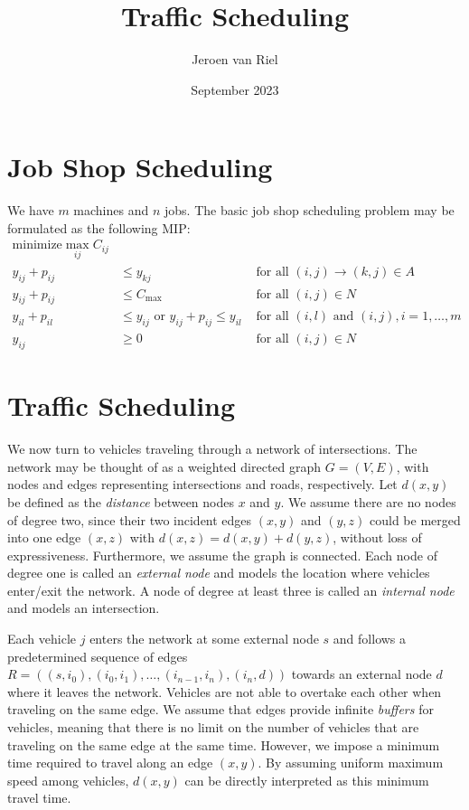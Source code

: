 \documentclass{article}
\title{Traffic Scheduling}
\author{Jeroen van Riel}
\date{September 2023}
\begin{document}
\maketitle

\section{Job Shop Scheduling}
We have $m$ machines and $n$ jobs. The basic job shop scheduling problem may be
formulated as the following MIP:
\begin{align*}
  \text{minimize} \max_{ij} C_{ij} \\
  y_{ij} + p_{ij} &\leq y_{kj}  & \text{ for all } (i,j) \xrightarrow{} (k,j) \in A \\
  y_{ij} + p_{ij} &\leq C_{\text{max}} & \text{ for all } (i,j) \in N \\
  y_{il} + p_{il} &\leq  y_{ij} \text{ or } y_{ij} + p_{ij} \leq y_{il}  & \text{ for all } (i,l) \text{ and } (i,j), i =1, \dots,m \\
  y_{ij} &\geq 0 & \text{ for all } (i,j) \in N
\end{align*}


\section{Traffic Scheduling}

We now turn to vehicles traveling through a network of intersections. The
network may be thought of as a weighted directed graph $G=(V,E)$, with nodes and
edges representing intersections and roads, respectively. Let $d(x,y)$ be
defined as the \textit{distance} between nodes $x$ and $y$. We assume there are
no nodes of degree two, since their two incident edges $(x,y)$ and $(y,z)$ could
be merged into one edge $(x,z)$ with $d(x,z) = d(x,y) + d(y,z)$, without loss of
expressiveness. Furthermore, we assume the graph is connected. Each node of
degree one is called an \textit{external node} and models the location where
vehicles enter/exit the network. A node of degree at least three is called an
\textit{internal node} and models an intersection.

Each vehicle $j$ enters the network at some external node $s$ and follows a
predetermined sequence of edges
$R = ((s,i_{0}), (i_{0},i_{1}), \dots, (i_{n-1},i_{n}), (i_{n},d))$ towards an
external node $d$ where it leaves the network. Vehicles are not able to overtake
each other when traveling on the same edge. We assume that edges provide
infinite \textit{buffers} for vehicles, meaning that there is no limit on the
number of vehicles that are traveling on the same edge at the same time.
However, we impose a minimum time required to travel along an edge $(x,y)$. By
assuming uniform maximum speed among vehicles, $d(x,y)$ can be directly
interpreted as this minimum travel time.
\end{document}
